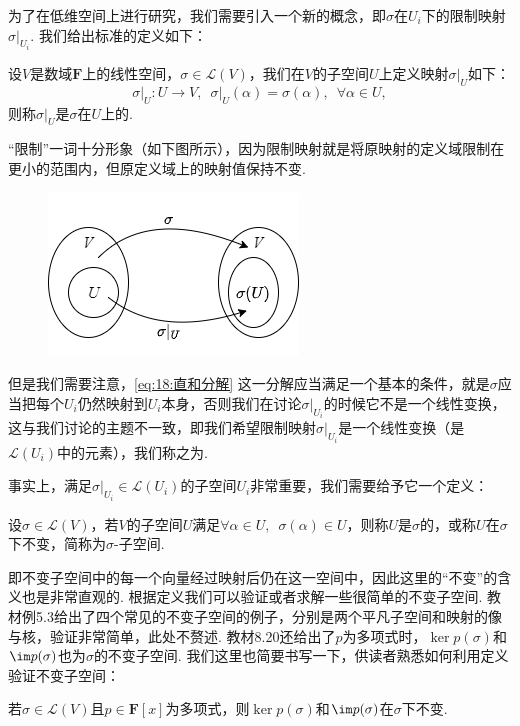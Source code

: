 为了在低维空间上进行研究，我们需要引入一个新的概念，即$\sigma$在$U_i$下的限制映射$\sigma\vert_{U_i}$. 我们给出标准的定义如下：
\begin{definition} 
    设$V$是数域$\mathbf{F}$上的线性空间，$\sigma\in\mathcal{L}(V)$，我们在$V$的子空间$U$上定义映射$\sigma\vert_U$如下：
    \[\sigma\vert_U:U\to V,\enspace\sigma\vert_U(\alpha)=\sigma(\alpha),\enspace\forall \alpha\in U,\]
    则称$\sigma\vert_U$是$\sigma$在$U$上的.
\end{definition}

``限制''一词十分形象（如下图所示），因为限制映射就是将原映射的定义域限制在更小的范围内，但原定义域上的映射值保持不变.
\begin{figure}[H]
    \centering
    \includegraphics[scale=0.7]{figs/18-1.png}
\end{figure}

但是我们需要注意，\autoref{eq:18:直和分解} 这一分解应当满足一个基本的条件，就是$\sigma$应当把每个$U_i$仍然映射到$U_i$本身，否则我们在讨论$\sigma\vert_{U_i}$的时候它不是一个线性变换，这与我们讨论的主题不一致，即我们希望限制映射$\sigma\vert_{U_i}$是一个线性变换（是$\mathcal{L}(U_i)$中的元素），我们称之为.

事实上，满足$\sigma\vert_{U_i}\in\mathcal{L}(U_i)$的子空间$U_i$非常重要，我们需要给予它一个定义：
\begin{definition}
    设$\sigma\in \mathcal{L}(V)$，若$V$的子空间$U$满足$\forall \alpha\in U,\enspace \sigma(\alpha)\in U$，则称$U$是$\sigma$的，或称$U$在$\sigma$下不变，简称为$\sigma$-子空间.
\end{definition}
即不变子空间中的每一个向量经过映射后仍在这一空间中，因此这里的``不变''的含义也是非常直观的. 根据定义我们可以验证或者求解一些很简单的不变子空间. 教材例5.3给出了四个常见的不变子空间的例子，分别是两个平凡子空间和映射的像与核，验证非常简单，此处不赘述. 教材8.20还给出了$p$为多项式时，$\ker p(\sigma)$和$\im p(\sigma)$也为$\sigma$的不变子空间. 我们这里也简要书写一下，供读者熟悉如何利用定义验证不变子空间：
\begin{example}
    若$\sigma\in\mathcal{L}(V)$且$p\in\mathbf{F}[x]$为多项式，则$\ker p(\sigma)$和$\im p(\sigma)$在$\sigma$下不变.
\end{example}

